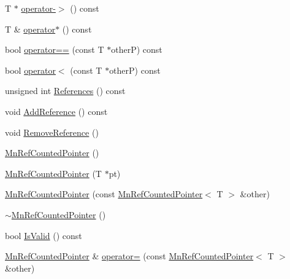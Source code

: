 \begin{DoxyCompactItemize}
\item 
T $\ast$ \mbox{\hyperlink{classROOT_1_1Minuit2_1_1MnRefCountedPointer_a9fa09cb52e1c503eb82c3359932eef34}{operator-\/$>$}} () const
\item 
T \& \mbox{\hyperlink{classROOT_1_1Minuit2_1_1MnRefCountedPointer_ab926bb95d092c87afef79bb6c1776bd4}{operator$\ast$}} () const
\item 
bool \mbox{\hyperlink{classROOT_1_1Minuit2_1_1MnRefCountedPointer_a2dbec0c22ef3492abc24cdaa885fd26e}{operator==}} (const T $\ast$otherP) const
\item 
bool \mbox{\hyperlink{classROOT_1_1Minuit2_1_1MnRefCountedPointer_a5927f1f650da34bb024a31e18119ed1e}{operator$<$}} (const T $\ast$otherP) const
\item 
unsigned int \mbox{\hyperlink{classROOT_1_1Minuit2_1_1MnRefCountedPointer_acffac58848d817d7747631954daf3e0c}{References}} () const
\item 
void \mbox{\hyperlink{classROOT_1_1Minuit2_1_1MnRefCountedPointer_a9a8d01a9009e9a9b272c14e46cbeb4d5}{Add\+Reference}} () const
\item 
void \mbox{\hyperlink{classROOT_1_1Minuit2_1_1MnRefCountedPointer_a8e348ffb51b9ed7793cce28e6330309f}{Remove\+Reference}} ()
\item 
\mbox{\hyperlink{classROOT_1_1Minuit2_1_1MnRefCountedPointer_ab597b297b8bc186cf67a2c6874c2d169}{Mn\+Ref\+Counted\+Pointer}} ()
\item 
\mbox{\hyperlink{classROOT_1_1Minuit2_1_1MnRefCountedPointer_a854656023f22c0c856c12047a0a7c0e0}{Mn\+Ref\+Counted\+Pointer}} (T $\ast$pt)
\item 
\mbox{\hyperlink{classROOT_1_1Minuit2_1_1MnRefCountedPointer_aec0e2c9c47a86046d393bfb63399db7d}{Mn\+Ref\+Counted\+Pointer}} (const \mbox{\hyperlink{classROOT_1_1Minuit2_1_1MnRefCountedPointer}{Mn\+Ref\+Counted\+Pointer}}$<$ T $>$ \&other)
\item 
\mbox{\hyperlink{classROOT_1_1Minuit2_1_1MnRefCountedPointer_ae3bdd5d92c9c44bd3490954bca60fd47}{$\sim$\+Mn\+Ref\+Counted\+Pointer}} ()
\item 
bool \mbox{\hyperlink{classROOT_1_1Minuit2_1_1MnRefCountedPointer_a29a80f5f0dce4b10f42b04b3b3cb264c}{Is\+Valid}} () const
\item 
\mbox{\hyperlink{classROOT_1_1Minuit2_1_1MnRefCountedPointer}{Mn\+Ref\+Counted\+Pointer}} \& \mbox{\hyperlink{classROOT_1_1Minuit2_1_1MnRefCountedPointer_a6a7380791625cf84a89a3b4fa32b7029}{operator=}} (const \mbox{\hyperlink{classROOT_1_1Minuit2_1_1MnRefCountedPointer}{Mn\+Ref\+Counted\+Pointer}}$<$ T $>$ \&other)

\end{DoxyCompactItemize}
